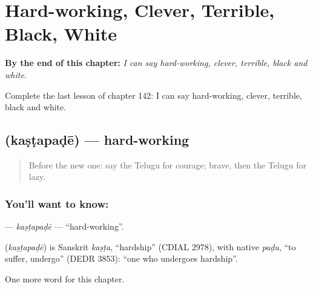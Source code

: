 
\chapter{Hard-working, Clever, Terrible, Black, White}
\label{ch:te-hard-working-clever-terrible-black-white}

\begin{chapteropening}
\textbf{By the end of this chapter:} \emph{I can say hard-working, clever, terrible, black and white.}

Complete the last lesson of chapter 142: I can say hard-working, clever, terrible, black and white.
\end{chapteropening}

\section[\texorpdfstring{\te{కష్టపడే} (kaṣṭapaḍē)}{కష్టపడే (kaṣṭapaḍē)}]{ (kaṣṭapaḍē) — hard-working}

\label{lesson:TE-C142-kastapade}



\begin{quote}
Before the new one: say the Telugu for courage; brave, then the Telugu for lazy.
\end{quote}

\subsection*{You'll want to know: }
\textbf{} — \emph{kaṣṭapaḍē} — \textquotedblleft{}hard-working\textquotedblright{}.

\begin{cousinweb}
\textbf{} (\emph{kaṣṭapaḍē}) is Sanskrit \emph{kaṣṭa}, \textquotedblleft{}hardship\textquotedblright{} (CDIAL 2978), with native \emph{paḍu}, \textquotedblleft{}to suffer, undergo\textquotedblright{} (DEDR 3853): \textquotedblleft{}one who undergoes hardship\textquotedblright{}.
\end{cousinweb}

\begin{grammarlens}[title={What you've built}]
One more word for this chapter.
\end{grammarlens}

